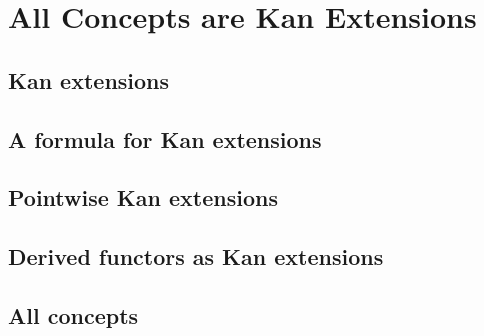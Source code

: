 \documentclass[../main]{subfiles}
\begin{document}
\chapter{All Concepts are Kan Extensions}
\section{Kan extensions}




\pagebreak
\section{A formula for Kan extensions}



\pagebreak
\section{Pointwise Kan extensions}



\pagebreak
\section{Derived functors as Kan extensions}





\pagebreak
\section{All concepts}







\end{document}
